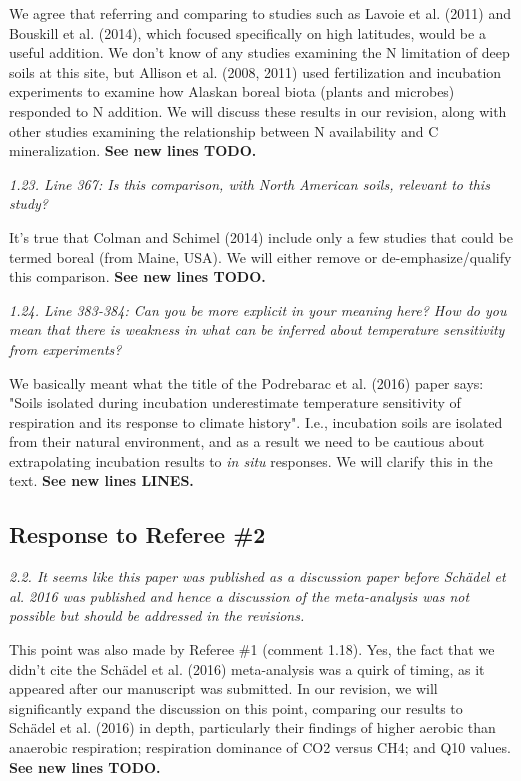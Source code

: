\documentclass[11pt, oneside]{article}
\begin{document}
We agree that referring and comparing to studies such as Lavoie et al. (2011) and Bouskill et al. (2014), which focused specifically on high latitudes, would be a useful addition. We don't know of any studies examining the N limitation of deep soils at this site, but Allison et al. (2008, 2011) used fertilization and incubation experiments to examine how Alaskan boreal biota (plants and microbes) responded to N addition. We will discuss these results in our revision, along with other studies examining the relationship between N availability and C mineralization. {\bf See new lines TODO.}

\medskip
{\it 1.23. Line 367: Is this comparison, with North American soils, relevant to this study? }

It's true that Colman and Schimel (2014) include only a few studies that could be termed boreal (from Maine, USA). We will either remove or de-emphasize/qualify this comparison.  {\bf See new lines TODO.}

\medskip
{\it 1.24. Line 383-384: Can you be more explicit in your meaning here? How do you mean that there is weakness in what can be inferred about temperature sensitivity from experiments? }

We basically meant what the title of the Podrebarac et al. (2016) paper says: "Soils isolated during incubation underestimate temperature sensitivity of respiration and its response to climate history". I.e., incubation soils are isolated from their natural environment, and as a result we need to be cautious about extrapolating incubation results to {\it in situ} responses. We will clarify this in the text. {\bf See new lines LINES.}


\newpage
\subsection*{Response to Referee \#2}

{\it 2.2. It seems like this paper was published as a discussion paper before Schädel et al. 2016 was published and hence a discussion of the meta-analysis was not possible but should be addressed in the revisions. }

This point was also made by Referee \#1 (comment 1.18). Yes, the fact that we didn't cite the Schädel et al. (2016) meta-analysis was a quirk of timing, as it appeared after our manuscript was submitted. In our revision, we will significantly expand the discussion on this point, comparing our results to Schädel et al. (2016) in depth, particularly their findings of higher aerobic than anaerobic respiration; respiration dominance of CO2 versus CH4; and Q10 values. {\bf See new lines TODO.}
\end{document}
